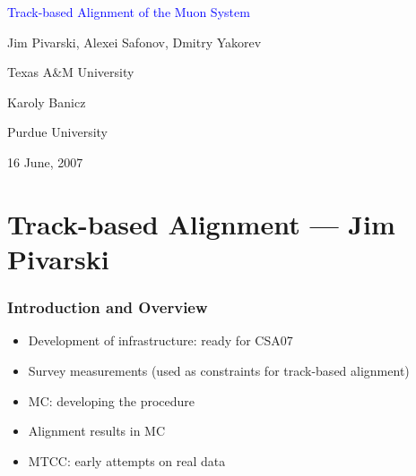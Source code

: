\documentclass[compress]{beamer}
\begin{document}
\begin{frame}
\begin{center}
\textcolor{blue}{\Large Track-based Alignment of the Muon System}

\vfill
Jim Pivarski, Alexei Safonov, Dmitry Yakorev

{\small Texas A\&M University}

\vfill
Karoly Banicz

{\small Purdue University}

\vfill
16 June, 2007
\end{center}
\end{frame}

% 
% 
% 
% 
% 
% 
% 
% 
% 
% 
% 
% 
% 
% 
% 
% 
% 
% 
% 
% 
% 
% 
% 
% 
% 
% 
% 
% 
% 
%  
   
\section*{Track-based Alignment --- Jim Pivarski}

\begin{frame}
\frametitle{Introduction and Overview}
\begin{itemize}\setlength{\itemsep}{0.5 cm}
\item Development of infrastructure: ready for CSA07
\item Survey measurements (used as constraints for track-based alignment)
\item MC: developing the procedure
\item Alignment results in MC
\item MTCC: early attempts on real data
\end{itemize}
\end{frame}
\end{document}
